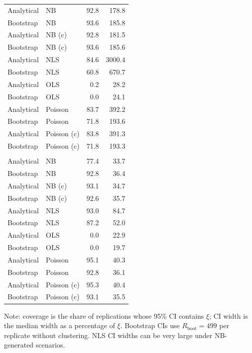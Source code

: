 \begin{table}[ht!]
\begin{tabular*}{\linewidth}{@{\extracolsep{\fill}}llrr}
\midrule\addlinespace[2.5pt]
Analytical & NB & 92.8 & 178.8 \\ 
Bootstrap & NB & 93.6 & 185.8 \\ 
Analytical & NB (c) & 92.8 & 181.5 \\ 
Bootstrap & NB (c) & 93.6 & 185.6 \\ 
Analytical & NLS & 84.6 & 3000.4 \\ 
Bootstrap & NLS & 60.8 & 670.7 \\ 
Analytical & OLS & 0.2 & 28.2 \\ 
Bootstrap & OLS & 0.0 & 24.1 \\ 
Analytical & Poisson & 83.7 & 392.2 \\ 
Bootstrap & Poisson & 71.8 & 193.6 \\ 
Analytical & Poisson (c) & 83.8 & 391.3 \\ 
Bootstrap & Poisson (c) & 71.8 & 193.3 \\ 
\midrule\addlinespace[2.5pt]
\multicolumn{4}{l}{Po(n)-Po(m)} \\[2.5pt] 
\midrule\addlinespace[2.5pt]
Analytical & NB & 77.4 & 33.7 \\ 
Bootstrap & NB & 92.8 & 36.4 \\ 
Analytical & NB (c) & 93.1 & 34.7 \\ 
Bootstrap & NB (c) & 92.6 & 35.7 \\ 
Analytical & NLS & 93.0 & 84.7 \\ 
Bootstrap & NLS & 87.2 & 52.0 \\ 
Analytical & OLS & 0.0 & 22.9 \\ 
Bootstrap & OLS & 0.0 & 19.7 \\ 
Analytical & Poisson & 95.1 & 40.3 \\ 
Bootstrap & Poisson & 92.8 & 36.1 \\ 
Analytical & Poisson (c) & 95.3 & 40.4 \\ 
Bootstrap & Poisson (c) & 93.1 & 35.5 \\ 
\bottomrule
\end{tabular*}
\begin{minipage}{\linewidth}
\vspace{.05em}
Note: coverage is the share of replications whose 95\% CI contains $\xi$; CI width is the median width as a percentage of $\xi$. Bootstrap CIs use $R_{\text{boot}} = 499$ per replicate without clustering. NLS CI widths can be very large under NB-generated scenarios.\\
\end{minipage}
\end{table}

